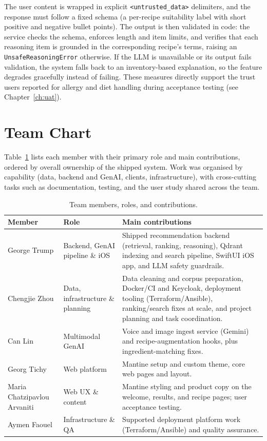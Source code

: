 The user content is wrapped in explicit \texttt{<untrusted\_data>} delimiters, and
the response must follow a fixed schema (a per-recipe suitability label with short
positive and negative bullet points). The output is then validated in code: the
service checks the schema, enforces length and item limits, and verifies that each
reasoning item is grounded in the corresponding recipe's terms, raising an
\texttt{UnsafeReasoningError} otherwise. If the LLM is unavailable or its output
fails validation, the system falls back to an inventory-based explanation, so the
feature degrades gracefully instead of failing. These measures directly support
the trust users reported for allergy and diet handling during acceptance testing
(see Chapter~\ref{ch:uat}).

\section{Team Chart}

Table~\ref{tab:pm-team} lists each member with their primary role and main
contributions, ordered by overall ownership of the shipped system. Work was
organised by capability (data, backend and GenAI, clients, infrastructure), with
cross-cutting tasks such as documentation, testing, and the user study shared
across the team.

\begin{table}[!ht]
    \centering
    \caption{Team members, roles, and contributions. %
    }
    \label{tab:pm-team}
    \begin{tabularx}{\textwidth}{@{}p{42mm}p{32mm}X@{}}
        \toprule
        \textbf{Member} & \textbf{Role} & \textbf{Main contributions} \\
        \midrule
        George Trump                & Backend, GenAI pipeline \& iOS & Shipped recommendation backend (retrieval, ranking, reasoning), Qdrant indexing and search pipeline, SwiftUI iOS app, and LLM safety guardrails. \\
        Chengjie Zhou               & Data, infrastructure \& planning & Data cleaning and corpus preparation, Docker/CI and Keycloak, deployment tooling (Terraform/Ansible), ranking/search fixes at scale, and project planning and task coordination. \\
        Can Lin                     & Multimodal GenAI & Voice and image ingest service (Gemini) and recipe-augmentation hooks, plus ingredient-matching fixes. \\
        Georg Tichy                 & Web platform & Mantine setup and custom theme, core web pages and layout. \\
        Maria Chatzipavlou Arvaniti & Web UX \& content & Mantine styling and product copy on the welcome, results, and recipe pages; user acceptance testing. \\
        Aymen Faouel                & Infrastructure \& QA & Supported deployment platform work (Terraform/Ansible) and quality assurance. \\
        \bottomrule
    \end{tabularx}
\end{table}

